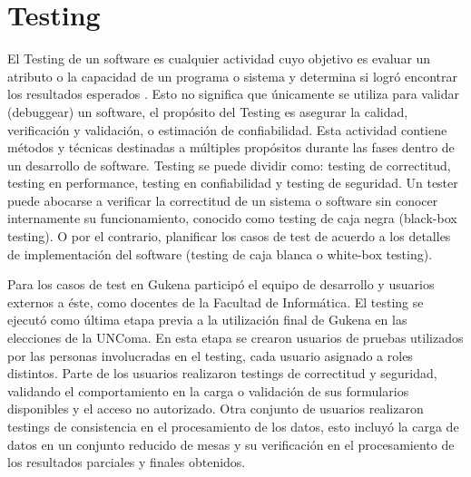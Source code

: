 \section{Testing}
El Testing de un software es cualquier actividad cuyo objetivo es evaluar un atributo o la capacidad de un programa o sistema y determina si logró encontrar los resultados esperados \cite{pan1999software}. Esto no significa que únicamente se utiliza para validar (debuggear) un software, el propósito del Testing es asegurar la calidad, verificación y validación, o estimación de confiabilidad. Esta actividad contiene métodos y técnicas destinadas a múltiples propósitos durante las fases dentro de un desarrollo de software. Testing se puede dividir como: testing de correctitud, testing en performance, testing en confiabilidad y testing de seguridad. Un tester puede abocarse a verificar la correctitud de un sistema o software sin conocer internamente su funcionamiento, conocido como testing de caja negra (black-box testing). O por el contrario, planificar los casos de test de acuerdo a los detalles de implementación del software (testing de caja blanca o white-box testing). 

Para los casos de test en Gukena participó el equipo de desarrollo y usuarios externos a éste, como docentes de la Facultad de Informática. El testing se ejecutó como última etapa previa a la utilización final de Gukena en las elecciones de la UNComa. En esta etapa se crearon usuarios de pruebas utilizados por las personas involucradas en el testing, cada usuario asignado a roles distintos. Parte de los usuarios realizaron testings de correctitud y seguridad, validando el comportamiento en la carga o validación de sus formularios disponibles y el acceso no autorizado. Otra conjunto de usuarios realizaron testings de consistencia en el procesamiento de los datos, esto incluyó la carga de datos en un conjunto reducido de mesas y su verificación en el procesamiento de los resultados parciales y finales obtenidos.

